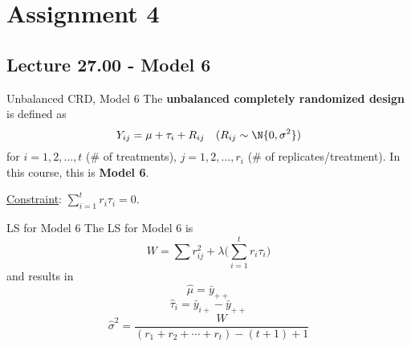 \chapter{Assignment 4}
\section{Lecture 27.00 - Model 6}
\begin{Definition}{Unbalanced CRD, Model 6}{}
    The \textbf{unbalanced completely randomized design} is defined as
    \[ Y_{ij}=\mu+\tau_i+R_{ij}\quad(R_{ij}\sim \N{0,\sigma^2}) \]
    for $ i=1,2,\ldots,t $ (\# of treatments),
    $ j=1,2,\ldots,r_i $ (\# of replicates/treatment).
    In this course, this is \textbf{Model 6}.

    \underline{Constraint}: $ \sum_{i=1}^{t} r_i \tau_i=0 $.
\end{Definition}
\begin{Example}{LS for Model 6}{}
    The LS for Model 6 is
    \[ W=\sum r_{ij}^2 +\lambda\biggl(\sum_{i=1}^{t} r_i\tau_i\biggr)  \]
    and results in
    \[ \hat{\mu}=\bar{y}_{++} \]
    \[ \hat{\tau}_i=\bar{y}_{i+}-\bar{y}_{++} \]
    \[ \hat{\sigma}^2=\frac{W}{(r_1+r_2+\cdots+r_t)-(t+1)+1}  \]
\end{Example}
